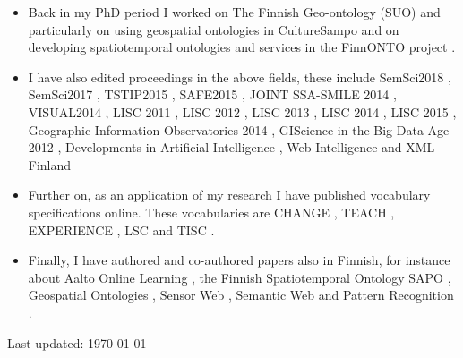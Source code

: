 \documentclass[11pt,letterpaper]{article}
\begin{document}
\begin{itemize}
\item Back in my PhD period I worked on The Finnish Geo-ontology (SUO)
		\cite{henriksson-kauppinen-hyvonen-suo-2008}
		\cite{kauppinen-et-al-spatiotemporal-2008}
		\cite{kauppinen-et-al-ontology-based-modeling-and-visualization-2006}
and particularly on using geospatial ontologies in CultureSampo
		\cite{kauppinen-et-al-geospatio-temporal-2010}
		\cite{kauppinen-deichstetter-hyvonen-temp-o-map2007}
		\cite{hyvonen-et-al-culturesampo-dh-jac-2009}
		\cite{hyvonen-et-al-culsa-mw-2009}
		\cite{hyvonen-et-al-culturesampo-dh-jac-2009}
		\cite{hyvonen-Kultuuurisampo-2008}
		\cite{hyvonen-et-al-culturesampo}
		\cite{CultureSampo2006}
				\cite{culturesampo-2007}
and on developing spatiotemporal ontologies and services \cite{kauppinen-et-al-spatiotemporal-2008}
		\cite{onkigeo-2007}	in the FinnONTO project \cite{hyvonen-et-al-elements-2007}
		\cite{ruotsalo-et-al-signum-2008}
		\cite{hyvonen-valo-et-al-creating-a-national-2005}
		\cite{hyvonen-valo-et-al-finnish-national-2005}
		\cite{makela-viljanen-et-al-semantic-web-widgets}
		\cite{ajax-2009}.

\item I have also edited proceedings in the above fields, these include SemSci2018 \cite{semsci2018},
SemSci2017 \cite{semsci2017}, TSTIP2015 \cite{tstip2015,tstip2015intro}, SAFE2015
\cite{safe-summary-2015}, JOINT SSA-SMILE 2014 \cite{joint-ssa2014-smile2014},
VISUAL2014 \cite{visual2014}, LISC 2011 \cite{lisc2011}, LISC 2012
\cite{lisc2012}, LISC 2013 \cite{lisc2013}, LISC 2014 \cite{lisc2014},
LISC 2015 \cite{lisc2015}, Geographic Information Observatories 2014
\cite{gio-2014-proc}, GIScience in the Big Data Age 2012 \cite{giscience-bigdata-2012}, Developments in Artificial Intelligence \cite{hyvonen-et-al-developments-in-artificial-intelligence-and-the-semantic-web-step-2006}, Web Intelligence
 			\cite{hyvonen-kauppinen-et-al-proceedings-of-the-2004}
 		and XML Finland
 			\cite{xml2005}
\item Further on, as an application of my research
I have published vocabulary specifications online. These vocabularies are CHANGE \cite{changevocab}, TEACH \cite{teachvocab},
EXPERIENCE \cite{experiencevocab}, LSC \cite{lscvocab} and TISC \cite{tiscvocab}.

\item Finally, I have authored and co-authored papers also in Finnish, for
instance about Aalto Online Learning \cite{aole-aikakauskirja-2017}, the Finnish
Spatiotemporal Ontology SAPO \cite{sapo-raportti}, Geospatial Ontologies \cite{henriksson-kauppinen-positio-2007}, Sensor Web \cite{havainnot-2013}, Semantic Web \cite{kauppinen-ruotsalo-salminen-tiedon-mallintaminen-2005} and Pattern Recognition
		\cite{hahmot-2003}.

\end{itemize}


\begin{center}
  \begin{footnotesize}
    Last updated: \today \\
  \end{footnotesize}
\end{center}



\end{document}

